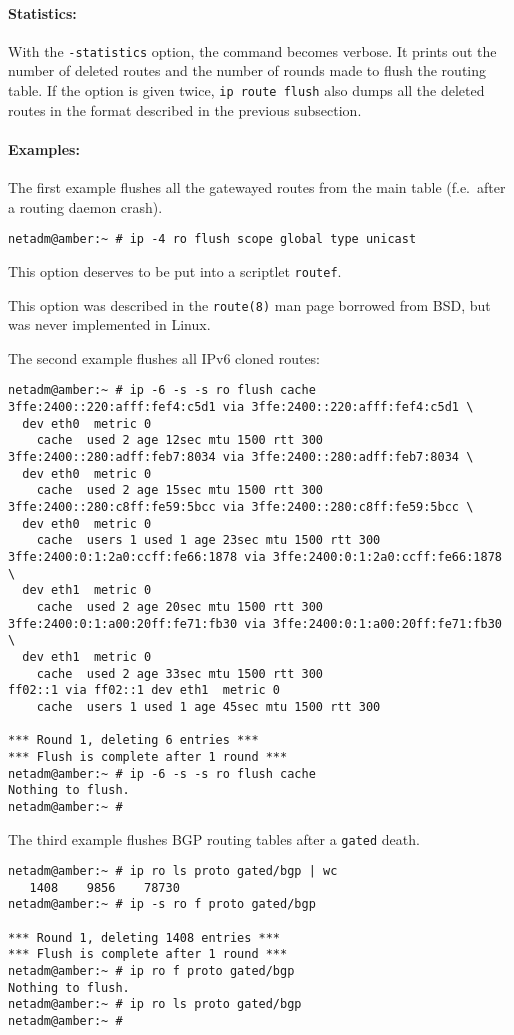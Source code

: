 \paragraph{Statistics:} With the \verb|-statistics| option, the command
becomes verbose. It prints out the number of deleted routes and the number
of rounds made to flush the routing table. If the option is given
twice, \verb|ip route flush| also dumps all the deleted routes
in the format described in the previous subsection.

\paragraph{Examples:} The first example flushes all the
gatewayed routes from the main table (f.e.\ after a routing daemon crash).
\begin{verbatim}
netadm@amber:~ # ip -4 ro flush scope global type unicast
\end{verbatim}
This option deserves to be put into a scriptlet \verb|routef|.
\begin{NB}
This option was described in the \verb|route(8)| man page borrowed
from BSD, but was never implemented in Linux.
\end{NB}

The second example flushes all IPv6 cloned routes:
\begin{verbatim}
netadm@amber:~ # ip -6 -s -s ro flush cache
3ffe:2400::220:afff:fef4:c5d1 via 3ffe:2400::220:afff:fef4:c5d1 \
  dev eth0  metric 0 
    cache  used 2 age 12sec mtu 1500 rtt 300
3ffe:2400::280:adff:feb7:8034 via 3ffe:2400::280:adff:feb7:8034 \
  dev eth0  metric 0 
    cache  used 2 age 15sec mtu 1500 rtt 300
3ffe:2400::280:c8ff:fe59:5bcc via 3ffe:2400::280:c8ff:fe59:5bcc \
  dev eth0  metric 0 
    cache  users 1 used 1 age 23sec mtu 1500 rtt 300
3ffe:2400:0:1:2a0:ccff:fe66:1878 via 3ffe:2400:0:1:2a0:ccff:fe66:1878 \
  dev eth1  metric 0 
    cache  used 2 age 20sec mtu 1500 rtt 300
3ffe:2400:0:1:a00:20ff:fe71:fb30 via 3ffe:2400:0:1:a00:20ff:fe71:fb30 \
  dev eth1  metric 0 
    cache  used 2 age 33sec mtu 1500 rtt 300
ff02::1 via ff02::1 dev eth1  metric 0 
    cache  users 1 used 1 age 45sec mtu 1500 rtt 300

*** Round 1, deleting 6 entries ***
*** Flush is complete after 1 round ***
netadm@amber:~ # ip -6 -s -s ro flush cache
Nothing to flush.
netadm@amber:~ #
\end{verbatim}

The third example flushes BGP routing tables after a \verb|gated|
death.
\begin{verbatim}
netadm@amber:~ # ip ro ls proto gated/bgp | wc
   1408    9856    78730
netadm@amber:~ # ip -s ro f proto gated/bgp

*** Round 1, deleting 1408 entries ***
*** Flush is complete after 1 round ***
netadm@amber:~ # ip ro f proto gated/bgp
Nothing to flush.
netadm@amber:~ # ip ro ls proto gated/bgp
netadm@amber:~ #
\end{verbatim}


